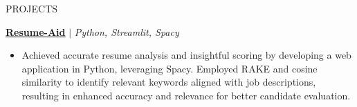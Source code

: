 \documentclass{resume} %
\begin{document}
\begin{rSection}{PROJECTS}
\vspace{0.05em}

\href{https://github.com/RutvikJ77/Resume-aid}{\textbf{\underline{Resume-Aid}}} $|$\textit{ Python, Streamlit, Spacy}
\begin{itemize}
    \item Achieved accurate resume analysis and insightful scoring by developing a web application in Python, leveraging Spacy. Employed RAKE and cosine similarity to identify relevant keywords aligned with job descriptions, resulting in enhanced accuracy and relevance for better candidate evaluation.
\end{itemize}




\end{rSection}
\end{document}
